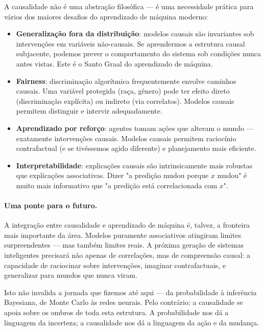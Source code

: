 \documentclass{tufte-handout}
\begin{document}
A causalidade não é uma abstração filosófica --- é uma necessidade prática para
vários dos maiores desafios do aprendizado de máquina moderno:

\begin{itemize}
    \item \textbf{Generalização fora da distribuição}: modelos causais são invariantes
    sob intervenções em variáveis não-causais. Se aprendermos a estrutura causal
    subjacente, podemos prever o comportamento do sistema sob condições nunca antes
    vistas. Este é o Santo Graal do aprendizado de máquina.
    \item \textbf{Fairness}: discriminação algorítmica frequentemente envolve
    caminhos causais. Uma variável protegida (raça, gênero) pode ter efeito direto
    (discriminação explícita) ou indireto (via correlatos). Modelos causais permitem
    distinguir e intervir adequadamente.
    \item \textbf{Aprendizado por reforço}: agentes tomam ações que alteram o mundo
    --- exatamente intervenções causais. Modelos causais permitem raciocínio
    contrafactual (e se tivéssemos agido diferente) e planejamento mais eficiente.
    \item \textbf{Interpretabilidade}: explicações causais são intrinsicamente mais
    robustas que explicações associativas. Dizer "a predição mudou porque $x$ mudou"
    é muito mais informativo que "a predição está correlacionada com $x$".
\end{itemize}

\paragraph{Uma ponte para o futuro.}

A integração entre causalidade e aprendizado de máquina é, talvez, a fronteira mais
importante da área. Modelos puramente associativos atingiram limites surpreendentes
--- mas também limites reais. A próxima geração de sistemas inteligentes precisará
não apenas de correlações, mas de compreensão causal: a capacidade de raciocinar
sobre intervenções, imaginar contrafactuais, e generalizar para mundos que nunca
viram.

Isto não invalida a jornada que fizemos até aqui --- da probabilidade à inferência
Bayesiana, de Monte Carlo às redes neurais. Pelo contrário: a causalidade se apoia
sobre os ombros de toda esta estrutura. A probabilidade nos dá a linguagem da
incerteza; a causalidade nos dá a linguagem da ação e da mudança.
\end{document}

